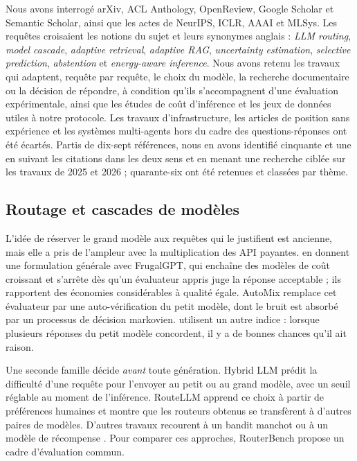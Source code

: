 \documentclass[11pt,a4paper]{article}
\begin{document}
Nous avons interrogé arXiv, ACL Anthology, OpenReview, Google Scholar et Semantic Scholar, ainsi que
les actes de NeurIPS, ICLR, AAAI et MLSys. Les requêtes croisaient les notions du sujet et leurs
synonymes anglais : \textit{LLM routing}, \textit{model cascade}, \textit{adaptive retrieval},
\textit{adaptive RAG}, \textit{uncertainty estimation}, \textit{selective prediction},
\textit{abstention} et \textit{energy-aware inference}. Nous avons retenu les travaux qui adaptent,
requête par requête, le choix du modèle, la recherche documentaire ou la décision de répondre, à
condition qu'ils s'accompagnent d'une évaluation expérimentale, ainsi que les études de coût
d'inférence et les jeux de données utiles à notre protocole. Les travaux d'infrastructure, les articles
de position sans expérience et les systèmes multi-agents hors du cadre des questions-réponses ont été
écartés. Partis de dix-sept références, nous en avons identifié cinquante et une en suivant les
citations dans les deux sens et en menant une recherche ciblée sur les travaux de 2025 et 2026 ;
quarante-six ont été retenues et classées par thème.

\subsection{Routage et cascades de modèles}

L'idée de réserver le grand modèle aux requêtes qui le justifient est ancienne, mais elle a pris de
l'ampleur avec la multiplication des API payantes. \citet{chen2023frugalgpt} en donnent une formulation
générale avec FrugalGPT, qui enchaîne des modèles de coût croissant et s'arrête dès qu'un évaluateur
appris juge la réponse acceptable ; ils rapportent des économies considérables à qualité égale. AutoMix
\citep{aggarwal2023automix} remplace cet évaluateur par une auto-vérification du petit modèle, dont le
bruit est absorbé par un processus de décision markovien. \citet{yue2023cascades} utilisent un autre
indice : lorsque plusieurs réponses du petit modèle concordent, il y a de bonnes chances qu'il ait
raison.

Une seconde famille décide \emph{avant} toute génération. Hybrid LLM \citep{ding2024hybrid} prédit la
difficulté d'une requête pour l'envoyer au petit ou au grand modèle, avec un seuil réglable au moment de
l'inférence. RouteLLM \citep{ong2024routellm} apprend ce choix à partir de préférences humaines et montre
que les routeurs obtenus se transfèrent à d'autres paires de modèles. D'autres travaux recourent à un
bandit manchot \citep{nguyen2024metallm} ou à un modèle de récompense \citep{lu2023zooter}. Pour
comparer ces approches, RouterBench \citep{hu2024routerbench} propose un cadre d'évaluation commun.
\end{document}

